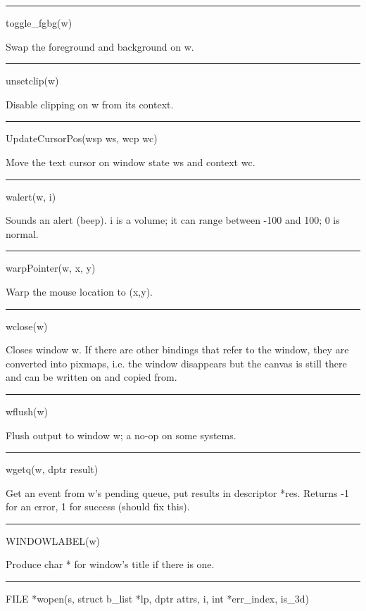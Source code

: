 \bigskip\hrule\vspace{0.1cm}
\noindent
toggle\_fgbg(w)


Swap the foreground and background on \textsf{w}.


\bigskip\hrule\vspace{0.1cm}
\noindent
unsetclip(w)


Disable clipping on \textsf{w} from its context.


\bigskip\hrule\vspace{0.1cm}
\noindent
UpdateCursorPos(wsp ws, wcp wc)


Move the text cursor on window state \textsf{ws} and context \textsf{wc}.


\bigskip\hrule\vspace{0.1cm}
\noindent
walert(w, i)


Sounds an alert (beep). \textsf{i} is a volume; it can range between
-100 and 100; 0 is normal.


\bigskip\hrule\vspace{0.1cm}
\noindent
warpPointer(w, x, y)


Warp the mouse location to (x,y).


\bigskip\hrule\vspace{0.1cm}
\noindent
wclose(w)


Closes window \textsf{w}. If there are other bindings that refer to
the window, they are converted into pixmaps, i.e.  the window
disappears but the canvas is still there and can be written on and
copied from.


\bigskip\hrule\vspace{0.1cm}
\noindent
wflush(w)


Flush output to window w; a no-op on some systems.


\bigskip\hrule\vspace{0.1cm}
\noindent
wgetq(w, dptr result)


Get an event from \textsf{w}{}'s pending queue, put results in
descriptor \textsf{*res}. Returns -1 for an error, 1 for success
(should fix this).


\bigskip\hrule\vspace{0.1cm}
\noindent
WINDOWLABEL(w)


Produce \textsf{char *} for window's title if there is one.

\bigskip\hrule\vspace{0.1cm}
\noindent



FILE *wopen(s, struct b\_list *lp, dptr attrs, i, int *err\_index, is\_3d)


